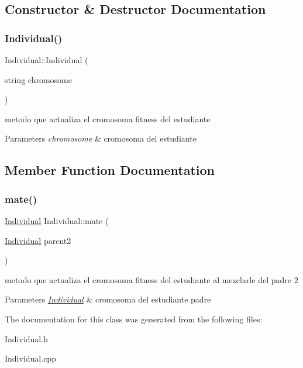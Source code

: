 \subsection{Constructor \& Destructor Documentation}
\mbox{\label{classIndividual_ace9a216e77ffd4f41b061f9c6371de1a}} 
\subsubsection{\texorpdfstring{Individual()}{Individual()}}
{\footnotesize\ttfamily Individual\+::\+Individual (\begin{DoxyParamCaption}\item[{string}]{chromosome }\end{DoxyParamCaption})}



metodo que actualiza el cromosoma fitness del estudiante 


\begin{DoxyParams}{Parameters}
{\em chromosome} & cromosoma del estudiante \\
\hline
\end{DoxyParams}


\subsection{Member Function Documentation}
\mbox{\label{classIndividual_ad13c5f27ed332f9cb5c387936cd59654}} 
\subsubsection{\texorpdfstring{mate()}{mate()}}
{\footnotesize\ttfamily \hyperlink{classIndividual}{Individual} Individual\+::mate (\begin{DoxyParamCaption}\item[{\hyperlink{classIndividual}{Individual}}]{parent2 }\end{DoxyParamCaption})}



metodo que actualiza el cromosoma fitness del estudiante al mezclarle del padre 2 


\begin{DoxyParams}{Parameters}
{\em \hyperlink{classIndividual}{Individual}} & cromosoma del estudiante padre \\
\hline
\end{DoxyParams}


The documentation for this class was generated from the following files\+:\begin{DoxyCompactItemize}
\item 
Individual.\+h\item 
Individual.\+cpp\end{DoxyCompactItemize}
